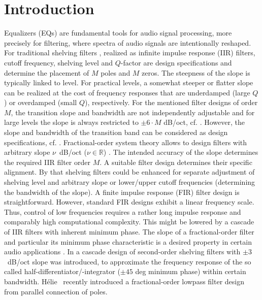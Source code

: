 \section{Introduction}
%
Equalizers (EQs) \cite{Valimaki2016} are fundamental tools for audio signal
processing, more precisely for filtering, where spectra of audio signals
are intentionally reshaped.
%
For traditional shelving filters
\cite{Kimball1938, Zolzer2011, Reiss2015, Jot2015}, realized as infinite
impulse response (IIR) filters, cutoff frequency, shelving level and $Q$-factor
are design specifications and determine the placement of $M$ poles and $M$ zeros.
%
The steepness of the slope is typically linked to level.
%
For practical levels, a somewhat steeper or flatter slope can be
realized at the cost of frequency responses that are
underdamped (large $Q$) or overdamped (small $Q$), respectively.
%
For the mentioned filter designs of order $M$, the transition slope and bandwidth
are not independently adjustable and for large levels the slope
is always restricted to $\pm 6 \cdot M$ dB/oct, cf. \cite{Holters2006a}.
%
However, the slope and bandwidth of the transition band can be considered
as design specifications, cf. \cite{McGrath2004}.
%
Fractional-order system theory allows to design filters with arbitrary
slope $\nu$~dB/oct ($\nu\in\mathbb{R}$) \cite{Helie2013, Acharya2014}.
%
The intended accuracy of the slope determines the required IIR filter order $M$.
%
A suitable filter design determines their specific alignment.
%
By that shelving filters could be enhanced for separate adjustment of
shelving level and arbitrary slope or lower/upper cutoff frequencies
(determining the bandwidth of the slope).
%
A finite impulse response (FIR) filter design is straightforward.
%
However, standard FIR designs exhibit a linear frequency scale.
%
Thus, control of low frequencies requires a rather long impulse response and
comparably high computational complexity.
%
This might be lowered by a cascade of IIR filters with
inherent minimum phase.
%
The slope of a fractional-order filter and particular its minimum phase
characteristic is a desired property in certain audio applications
\cite{McGrath2004,Spors2010a}.
%
%
%
\NewL In \cite{Schultz2016} a cascade design of second-order shelving
filters with $\pm 3$~dB/oct slope was introduced, to
approximate the frequency response
of the so called half-differentiator/-integrator ($\pm 45$ deg minimum phase)
within certain bandwidth.
%
H{\'e}lie~\cite{Helie2013} recently introduced
a fractional-order lowpass filter design from parallel connection of poles.
%
